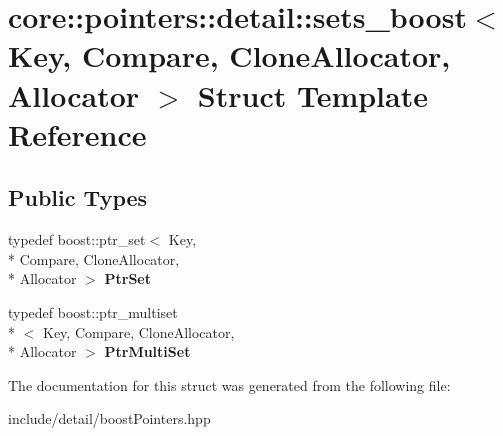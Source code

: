 \hypertarget{structcore_1_1pointers_1_1detail_1_1sets__boost}{\section{core\-:\-:pointers\-:\-:detail\-:\-:sets\-\_\-boost$<$ Key, Compare, Clone\-Allocator, Allocator $>$ Struct Template Reference}
\label{structcore_1_1pointers_1_1detail_1_1sets__boost}
}
\subsection*{Public Types}
\begin{DoxyCompactItemize}
\item 
\hypertarget{structcore_1_1pointers_1_1detail_1_1sets__boost_a0b0ed5cbf22c37e6c3c18188bf994237}{typedef boost\-::ptr\-\_\-set$<$ Key, \\*
Compare, Clone\-Allocator, \\*
Allocator $>$ {\bfseries Ptr\-Set}}\label{structcore_1_1pointers_1_1detail_1_1sets__boost_a0b0ed5cbf22c37e6c3c18188bf994237}

\item 
\hypertarget{structcore_1_1pointers_1_1detail_1_1sets__boost_a3c3c994b1e4e8a7cfbeda6d19feb9791}{typedef boost\-::ptr\-\_\-multiset\\*
$<$ Key, Compare, Clone\-Allocator, \\*
Allocator $>$ {\bfseries Ptr\-Multi\-Set}}\label{structcore_1_1pointers_1_1detail_1_1sets__boost_a3c3c994b1e4e8a7cfbeda6d19feb9791}

\end{DoxyCompactItemize}


The documentation for this struct was generated from the following file\-:\begin{DoxyCompactItemize}
\item 
include/detail/boost\-Pointers.\-hpp\end{DoxyCompactItemize}
